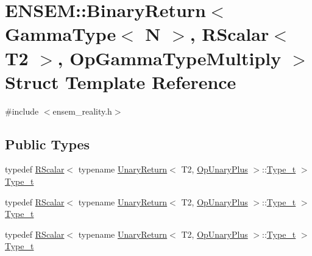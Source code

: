 \hypertarget{structENSEM_1_1BinaryReturn_3_01GammaType_3_01N_01_4_00_01RScalar_3_01T2_01_4_00_01OpGammaTypeMultiply_01_4}{}\section{E\+N\+S\+EM\+:\+:Binary\+Return$<$ Gamma\+Type$<$ N $>$, R\+Scalar$<$ T2 $>$, Op\+Gamma\+Type\+Multiply $>$ Struct Template Reference}
\label{structENSEM_1_1BinaryReturn_3_01GammaType_3_01N_01_4_00_01RScalar_3_01T2_01_4_00_01OpGammaTypeMultiply_01_4}


{\ttfamily \#include $<$ensem\+\_\+reality.\+h$>$}

\subsection*{Public Types}
\begin{DoxyCompactItemize}
\item 
typedef \mbox{\hyperlink{classENSEM_1_1RScalar}{R\+Scalar}}$<$ typename \mbox{\hyperlink{structENSEM_1_1UnaryReturn}{Unary\+Return}}$<$ T2, \mbox{\hyperlink{structENSEM_1_1OpUnaryPlus}{Op\+Unary\+Plus}} $>$\+::\mbox{\hyperlink{structENSEM_1_1BinaryReturn_3_01GammaType_3_01N_01_4_00_01RScalar_3_01T2_01_4_00_01OpGammaTypeMultiply_01_4_a943d82dee1746ec497924dece721a7d7}{Type\+\_\+t}} $>$ \mbox{\hyperlink{structENSEM_1_1BinaryReturn_3_01GammaType_3_01N_01_4_00_01RScalar_3_01T2_01_4_00_01OpGammaTypeMultiply_01_4_a943d82dee1746ec497924dece721a7d7}{Type\+\_\+t}}
\item 
typedef \mbox{\hyperlink{classENSEM_1_1RScalar}{R\+Scalar}}$<$ typename \mbox{\hyperlink{structENSEM_1_1UnaryReturn}{Unary\+Return}}$<$ T2, \mbox{\hyperlink{structENSEM_1_1OpUnaryPlus}{Op\+Unary\+Plus}} $>$\+::\mbox{\hyperlink{structENSEM_1_1BinaryReturn_3_01GammaType_3_01N_01_4_00_01RScalar_3_01T2_01_4_00_01OpGammaTypeMultiply_01_4_a943d82dee1746ec497924dece721a7d7}{Type\+\_\+t}} $>$ \mbox{\hyperlink{structENSEM_1_1BinaryReturn_3_01GammaType_3_01N_01_4_00_01RScalar_3_01T2_01_4_00_01OpGammaTypeMultiply_01_4_a943d82dee1746ec497924dece721a7d7}{Type\+\_\+t}}
\item 
typedef \mbox{\hyperlink{classENSEM_1_1RScalar}{R\+Scalar}}$<$ typename \mbox{\hyperlink{structENSEM_1_1UnaryReturn}{Unary\+Return}}$<$ T2, \mbox{\hyperlink{structENSEM_1_1OpUnaryPlus}{Op\+Unary\+Plus}} $>$\+::\mbox{\hyperlink{structENSEM_1_1BinaryReturn_3_01GammaType_3_01N_01_4_00_01RScalar_3_01T2_01_4_00_01OpGammaTypeMultiply_01_4_a943d82dee1746ec497924dece721a7d7}{Type\+\_\+t}} $>$ \mbox{\hyperlink{structENSEM_1_1BinaryReturn_3_01GammaType_3_01N_01_4_00_01RScalar_3_01T2_01_4_00_01OpGammaTypeMultiply_01_4_a943d82dee1746ec497924dece721a7d7}{Type\+\_\+t}}
\end{DoxyCompactItemize}


